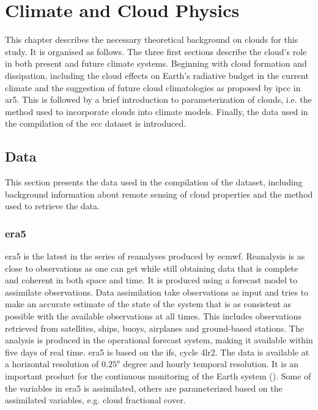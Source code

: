 \setcounter{chapter}{1} 
\chapter{Climate and Cloud Physics}
\label{ch:theoretical_back}
This chapter describes the necessary theoretical background on clouds for this study. It is organised as follows. The three first sections describe the cloud's role in both present and future climate systems. Beginning with cloud formation and dissipation, including the cloud effects on Earth's radiative budget in the current climate and the suggestion of future cloud climatologies as proposed by \acrshort{ipcc} in \acrshort{ar5}. This is followed by a brief introduction to parameterization of clouds, i.e. the method used to incorporate clouds into climate models.
Finally, the data used in the compilation of the \acrshort{ecc} dataset is introduced. 




\section{Data}
This section presents the data used in the compilation of the dataset, including background information about remote sensing of cloud properties and the method used to retrieve the data. 

\subsection{\acrshort{era5}} \label{sec:era5}
\acrshort{era5} is the latest in the series of reanalyses produced by \acrfull{ecmwf}. Reanalysis is as close to observations as one can get while still obtaining data that is complete and coherent in both space and time. It is produced using a forecast model to assimilate observations. Data assimilation take observations as input and tries to make an accurate estimate of the state of the system that is as consistent as possible with the available observations at all times. This includes observations retrieved from satellites, ships, buoys, airplanes and ground-based stations. The analysis is produced in the operational forecast system, making it available within five days of real time. \acrshort{era5} is based on the \acrshort{ifs}, cycle 4lr2. The data is available at a horizontal resolution of $0.25^o$ degree and hourly temporal resolution. It is an important product for the continuous monitoring of the Earth system 
(\cite{Hersbach2018OperationalStatus}). Some of the variables in \acrshort{era5} is assimilated, others are parameterized based on the assimilated variables, e.g. cloud fractional cover.

